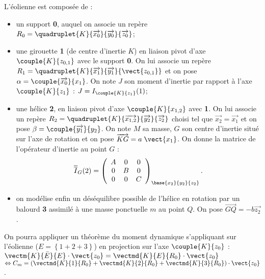 L'éolienne est composée de : 
\begin{itemize}
\item un support \textbf{0}, auquel on associe un repère $R_0=\quadruplet{K}{\overrightarrow{x_0}}{\overrightarrow{y_0}}{\overrightarrow{z_0}}$;
\item une girouette \textbf{1} (de centre d'inertie $K$) en liaison pivot d'axe $\couple{K}{{z}_{0,1}}$ avec le support \textbf{0}. On lui associe un repère $R_1=\quadruplet{K}{\overrightarrow{x_1}}{\overrightarrow{y_1}}{\vect{z_{0,1}}}$ et on pose $\alpha=\couple{\overrightarrow{x_0}}{{x}_1}$. On note $J$ son moment d'inertie par rapport à l'axe $\couple{K}{{z}_1}$ : $J=I_{\couple{K}{{z}_1}}(1)$;
\item une hélice \textbf{2}, en liaison pivot d'axe $\couple{K}{{x}_{1,2}}$  avec \textbf{1}. On lui associe un repère $R_2=\quadruplet{K}{\overrightarrow{x_{1,2}}}{\overrightarrow{y_2}}{\overrightarrow{z_2}}$  choisi tel que $\overrightarrow{x_2}=\overrightarrow{x_1}$ et on pose $\beta=\couple{\overrightarrow{y_1}}{{y}_2}$.
On note $M$ sa masse, $G$ son centre d'inertie situé sur l'axe de rotation et on pose $\overrightarrow{KG}=a\;\vect{x_{1}}$. On donne la matrice de l'opérateur d'inertie au point $G$ :
\begin{align*}
\overline{\overline{I}}_G(2)=
\left(
\begin{array}{ccc}
A & 0 & 0 \\ 
0 & B & 0 \\ 
0 & 0 & C
\end{array}
\right)_{\base{{x}_2}{{y}_2}{{z}_2}}.
\end{align*}
 

\item on modélise enfin un déséquilibre possible de l'hélice en rotation par un balourd \textbf{3} assimilé à une masse ponctuelle $m$ au point $Q$. On pose $\overrightarrow{GQ}=-b\overrightarrow{z_2}$.
\end{itemize}

\fi

\ifprof
\begin{corrige}

\end{corrige}
\else
\fi


\ifprof
\begin{corrige}
On pourra appliquer un théorème du moment dynamique s'appliquant sur l'éolienne ($E=\left\{1+2+3\right\}$) en projection sur l'axe $\couple{K}{{z}_0}$  : 
$\vectm{K}{\bar E}{E}\cdot \vect{z_0}=\vectmd{K}{E}{R_0}\cdot \vect{z_0}$
$\Leftrightarrow
C_m=\left(\vectmd{K}{1}{R_0}+\vectmd{K}{2}{R_0}+\vectmd{K}{3}{R_0}\right)\cdot \vect{z_0}$.
\end{corrige}
\else
\fi


